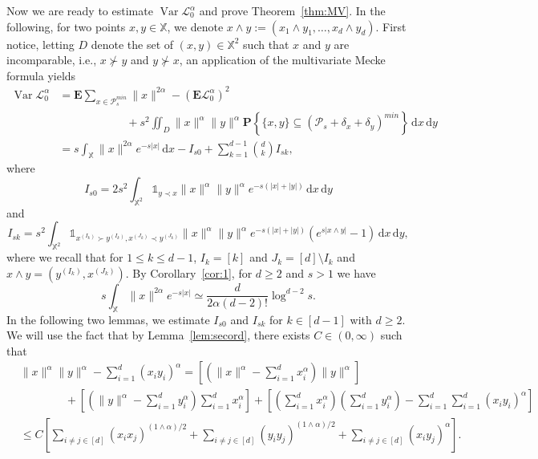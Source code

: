 \documentclass[11pt,reqno]{amsart}
\numberwithin{equation}{section}
\theoremstyle{definition}
\newcommand{\E}{\mathbf{E}}
\newcommand{\sP}{\mathcal{P}}
\newcommand{\Prob}[1]{\mathbf P\left\{#1\right\}}
\newcommand{\XX}{\mathbb{X}}
\newcommand{\diff}{{\,\mathrm d}}
\DeclareMathOperator{\Var}{Var}
\begin{document}
Now we are ready to estimate $\Var{\mathscr{L}_0^{\alpha}}$ and prove Theorem~\ref{thm:MV}. In the following, for two points $x,y \in \XX$, we denote $x \wedge y:=(x_1 \wedge y_1, \dots, x_d \wedge y_d)$. First notice, letting $D$ denote the set of $(x,y) \in \XX^2$ such that $x$ and $y$ are
incomparable, i.e., $x \not \succ y$ and $y \not \succ x$, an application of the multivariate Mecke formula yields
\begin{align}\label{eq:Vspl}
	\Var{\mathscr{L}_0^{\alpha}}&= \E \sum_{x \in \sP_{s}^{min}} \|x\|^{2\alpha} - (\E \mathscr{L}_0^{\alpha})^2\nonumber\\
	&\qquad \qquad \qquad   + s^2 \iint_{D} \|x\|^{\alpha} \|y\|^{\alpha} \Prob{\{x,y\} \subseteq (\sP_s+\delta_x+\delta_y)^{min}} \diff x \diff y\nonumber\\
	& =s \int_\XX \|x\|^{2\alpha} e^{-s|x|} \diff x - I_{s0} + \sum_{k=1}^{d-1} \binom{d}{k} I_{sk},
\end{align}
where
\begin{equation*}
I_{s0}=2s^2 \int_{\XX^2} \mathds{1}_{y \prec x} \|x\|^{\alpha} \|y\|^{\alpha} e^{-s(|x|+|y|)} \diff x \diff y
\end{equation*}
and
\begin{equation*}
I_{sk}=s^2 \int_{\XX^2} \mathds{1}_{x^{(I_k)} \succ y^{(I_k)}, x^{(J_k)} \prec y^{(J_k)}}  \|x\|^{\alpha} \|y\|^{\alpha} e^{-s(|x|+|y|)} (e^{s|x \wedge y|} -1)  \diff x \diff y,
\end{equation*}
where we recall that for $1 \le k \le d-1$, $I_k=[k]$ and $J_k=[d] \setminus I_k$ and $x \wedge y=(y^{(I_k)},x^{(J_k)})$. By Corollary~\ref{cor:1}, for $d \ge 2$ and $s>1$ we have
\begin{equation}\label{eq:c}
	s \int_\XX \|x\|^{2\alpha} e^{-s|x|} \simeq \frac{d}{2\alpha (d-2)!} \log^{d-2} s.
\end{equation}
In the following two lemmas, we estimate $I_{s0}$ and $I_{sk}$ for $k \in [d-1]$ with $d \ge 2$. We will use the fact that by Lemma~\ref{lem:secord}, there exists $C \in (0,\infty)$ such that
\begin{align}\label{eq:split}
	&\|x\|^{\alpha} \|y\|^{\alpha} - \sum_{i=1}^d (x_i y_i)^{\alpha}=\left[\left(\|x\|^{\alpha} -  \sum_{i=1}^d x_i^\alpha\right) \|y\|^{\alpha} \right]\nonumber\\
	&\qquad \qquad + \left[ \left(\|y\|^{\alpha} - \sum_{i=1}^d y_i^\alpha \right) \sum_{i=1}^d x_i^\alpha \right] + \left[\left(\sum_{i=1}^d x_i^\alpha\right)\left(\sum_{i=1}^d y_i^\alpha\right) - \sum_{i=1}^d \sum_{i=1}^d (x_i y_i)^{\alpha}\right]\nonumber\\
	& \le C\left[ \sum_{i \not = j \in [d]} (x_i x_j)^{(1 \wedge \alpha)/2} + \sum_{i \not = j \in [d]} (y_i y_j)^{(1 \wedge \alpha)/2} + \sum_{i \not = j \in [d]} (x_i y_j)^{\alpha} \right].
\end{align}
\end{document}
